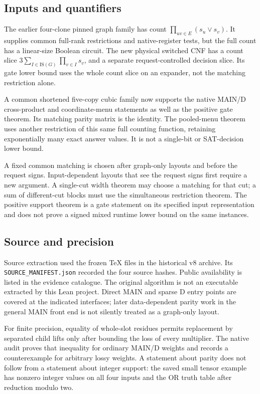 \documentclass[11pt,a4paper]{article}
\begin{document}
\subsection{Inputs and quantifiers}\label{v8-inputs-and-quantifiers}

The earlier four-clone pinned graph family has count
\(\prod_{uv\in E}(s_u\lor s_v)\). It supplies common full-rank
restrictions and native-register tests, but the full count has a
linear-size Boolean circuit. The new physical switched CNF has a count
slice \(3\sum_{I\in\mathrm{IS}(G)}\prod_{v\in I}s_v\), and a separate
request-controlled decision slice. Its gate lower bound uses the whole
count slice on an expander, not the matching restriction alone.

A common shortened five-copy cubic family now supports the native MAIN/D
cross-product and coordinate-menu statements as well as the positive
gate theorem. Its matching parity matrix is the identity. The
pooled-menu theorem uses another restriction of this same full counting
function, retaining exponentially many exact answer values. It is not a
single-bit or SAT-decision lower bound.

A fixed common matching is chosen after graph-only layouts and before
the request signs. Input-dependent layouts that see the request signs
first require a new argument. A single-cut width theorem may choose a
matching for that cut; a sum of different-cut blocks must use the
simultaneous restriction theorem. The positive support theorem is a gate
statement on its specified input representation and does not prove a
signed mixed runtime lower bound on the same instances.

\subsection{Source and precision}\label{v8-source-and-precision}

Source extraction used the frozen TeX files in the historical v8
archive. Its \nolinkurl{SOURCE_MANIFEST.json} recorded the four source
hashes. Public availability is listed in the evidence catalogue. The original algorithm is not an
executable extracted by this Lean project. Direct MAIN and sparse D
entry points are covered at the indicated interfaces; later
data-dependent parity work in the general MAIN front end is not silently
treated as a graph-only layout.

For finite precision, equality of whole-slot residues permits
replacement by separated child lifts only after bounding the loss of
every multiplier. The native audit proves that inequality for ordinary
MAIN/D weights and records a counterexample for arbitrary lossy weights.
A statement about parity does not follow from a statement about integer
support: the saved small tensor example has nonzero integer values on
all four inputs and the OR truth table after reduction modulo two.
\end{document}

